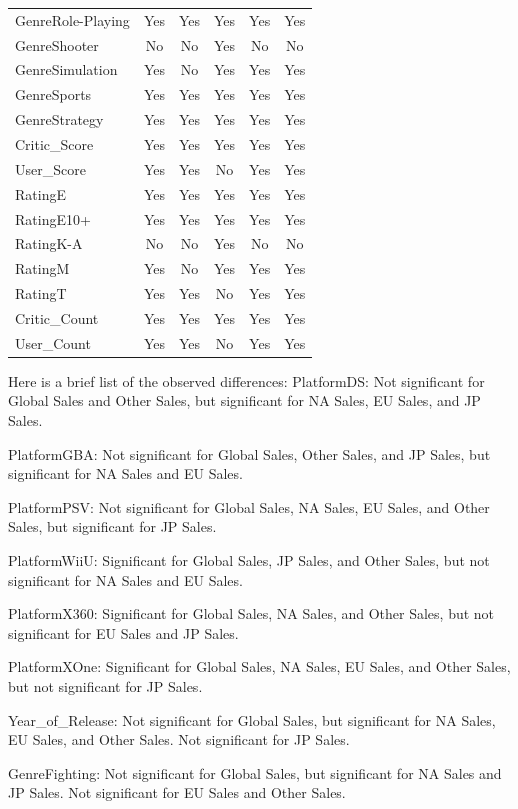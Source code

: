 \documentclass[12pt]{article}
\begin{document}
\begin{table}[ht]
\begin{tabular}{lccccc}
    GenreRole-Playing & Yes & Yes & Yes & Yes & Yes \\
    GenreShooter & No & No & Yes & No & No \\
    GenreSimulation & Yes & No & Yes & Yes & Yes \\
    GenreSports & Yes & Yes & Yes & Yes & Yes \\
    GenreStrategy & Yes & Yes & Yes & Yes & Yes \\
    Critic\_Score & Yes & Yes & Yes & Yes & Yes \\
    User\_Score & Yes & Yes & No & Yes & Yes \\
    RatingE & Yes & Yes & Yes & Yes & Yes \\
    RatingE10+ & Yes & Yes & Yes & Yes & Yes \\
    RatingK-A & No & No & Yes & No & No \\
    RatingM & Yes & No & Yes & Yes & Yes \\
    RatingT & Yes & Yes & No & Yes & Yes \\
    Critic\_Count & Yes & Yes & Yes & Yes & Yes \\
    User\_Count & Yes & Yes & No & Yes & Yes \\
    \hline
  \end{tabular}
\end{table}

Here is a brief list of the observed differences:
PlatformDS: Not significant for Global Sales and Other Sales, but significant for NA Sales, EU Sales, and JP Sales.

PlatformGBA: Not significant for Global Sales, Other Sales, and JP Sales, but significant for NA Sales and EU Sales.

PlatformPSV: Not significant for Global Sales, NA Sales, EU Sales, and Other Sales, but significant for JP Sales.

PlatformWiiU: Significant for Global Sales, JP Sales, and Other Sales, but not significant for NA Sales and EU Sales.

PlatformX360: Significant for Global Sales, NA Sales, and Other Sales, but not significant for EU Sales and JP Sales.

PlatformXOne: Significant for Global Sales, NA Sales, EU Sales, and Other Sales, but not significant for JP Sales.

Year_of_Release: Not significant for Global Sales, but significant for NA Sales, EU Sales, and Other Sales. Not significant for JP Sales.

GenreFighting: Not significant for Global Sales, but significant for NA Sales and JP Sales. Not significant for EU Sales and Other Sales.
\end{document}
